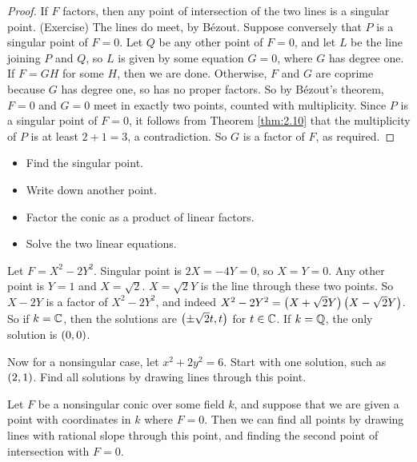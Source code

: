 \begin{proof}
If $ F $ factors, then any point of intersection of the two lines is a singular point. (Exercise) The lines do meet, by Bézout. Suppose conversely that $ P $ is a singular point of $ F = 0 $. Let $ Q $ be any other point of $ F = 0 $, and let $ L $ be the line joining $ P $ and $ Q $, so $ L $ is given by some equation $ G = 0 $, where $ G $ has degree one. If $ F = GH $ for some $ H $, then we are done. Otherwise, $ F $ and $ G $ are coprime because $ G $ has degree one, so has no proper factors. So by Bézout's theorem, $ F = 0 $ and $ G = 0 $ meet in exactly two points, counted with multiplicity. Since $ P $ is a singular point of $ F = 0 $, it follows from Theorem \ref{thm:2.10} that the multiplicity of $ P $ is at least $ 2 + 1 = 3 $, a contradiction. So $ G $ is a factor of $ F $, as required.
\end{proof}

\pagebreak

\begin{algorithm}
\hfill
\begin{itemize}
\item Find the singular point.
\item Write down another point.
\item Factor the conic as a product of linear factors.
\item Solve the two linear equations.
\end{itemize}
\end{algorithm}

\begin{example*}
Let $ F = X^2 - 2Y^2 $. Singular point is $ 2X = -4Y = 0 $, so $ X = Y = 0 $. Any other point is $ Y = 1 $ and $ X = \sqrt{2} $. $ X = \sqrt{2}Y $ is the line through these two points. So $ X - 2Y $ is a factor of $ X^2 - 2Y^2 $, and indeed $ X^2 - 2Y^2 = \left( X + \sqrt{2}Y \right)\left( X - \sqrt{2}Y \right) $. So if $ k = \mathbb{C} $, then the solutions are $ \left( \pm\sqrt{2}t, t \right) $ for $ t \in \mathbb{C} $. If $ k = \mathbb{Q} $, the only solution is $ \left( 0, 0 \right) $.
\end{example*}

\begin{example*}
Now for a nonsingular case, let $ x^2 + 2y^2 = 6 $. Start with one solution, such as $ \left( 2, 1 \right) $. Find all solutions by drawing lines through this point.
\end{example*}

\begin{algorithm}
Let $ F $ be a nonsingular conic over some field $ k $, and suppose that we are given a point with coordinates in $ k $ where $ F = 0 $. Then we can find all points by drawing lines with rational slope through this point, and finding the second point of intersection with $ F = 0 $.
\end{algorithm}


